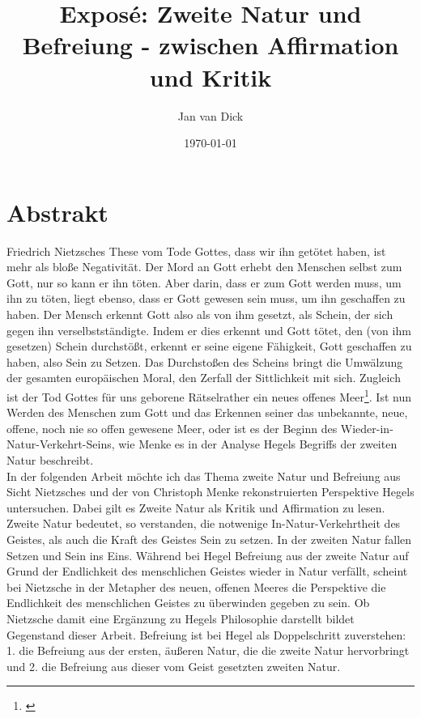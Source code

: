 \documentclass[a4paper, 12pt]{article}
\title{Exposé: \glqq Zweite Natur und Befreiung - zwischen Affirmation und Kritik\grqq}
\author{Jan van Dick}
\date{\today}
\begin{document}
\maketitle

\section{Abstrakt}
Friedrich Nietzsches These vom Tode Gottes, dass \glqq wir\grqq{} ihn getötet haben, ist mehr als bloße Negativität. 
Der Mord an Gott erhebt den Menschen selbst zum Gott, nur so kann er ihn töten.
Aber darin, dass er zum Gott werden muss, um ihn zu töten, liegt ebenso, dass er Gott gewesen sein muss, um ihn geschaffen zu haben.
Der Mensch erkennt Gott also als von ihm gesetzt, als Schein, der sich gegen ihn verselbstständigte.
Indem er dies erkennt und Gott tötet, den (von ihm gesetzen) Schein durchstößt, erkennt er seine eigene Fähigkeit, Gott geschaffen zu haben, also Sein zu Setzen. 
Das Durchstoßen des Scheins bringt die Umwälzung der gesamten europäischen Moral, den Zerfall der Sittlichkeit mit sich.
Zugleich ist der Tod Gottes für uns \glqq geborene Rätselrather\grqq{} ein \glqq neues offenes Meer\grqq \footnote{\citeauthor[Vgl.][573]{nietzsche_morgenrote_1999}}.
Ist nun Werden des Menschen zum Gott und das Erkennen seiner das unbekannte, neue, offene, noch nie so offen gewesene Meer, oder ist es der Beginn des Wieder-in-Natur-Verkehrt-Seins, wie Menke es in der Analyse Hegels Begriffs der zweiten Natur beschreibt.\\
In der folgenden Arbeit möchte ich das Thema zweite Natur und Befreiung aus Sicht Nietzsches und der von Christoph Menke rekonstruierten Perspektive Hegels untersuchen.
Dabei gilt es Zweite Natur als Kritik und Affirmation zu lesen. 
Zweite Natur bedeutet, so verstanden, die notwenige In-Natur-Verkehrtheit des Geistes, als auch die Kraft des Geistes Sein zu setzen. 
In der zweiten Natur fallen Setzen und Sein ins Eins.
Während bei Hegel Befreiung aus der zweite Natur auf Grund der Endlichkeit des menschlichen Geistes wieder in Natur verfällt, scheint bei Nietzsche in der Metapher des neuen, offenen Meeres die Perspektive die Endlichkeit des menschlichen Geistes zu überwinden gegeben zu sein. 
Ob Nietzsche damit eine Ergänzung zu Hegels Philosophie darstellt bildet Gegenstand dieser Arbeit. 
Befreiung ist bei Hegel als Doppelschritt zuverstehen: 1. die Befreiung aus der ersten, äußeren Natur, die die zweite Natur hervorbringt und 2. die Befreiung aus dieser vom Geist gesetzten zweiten Natur.
\end{document}
